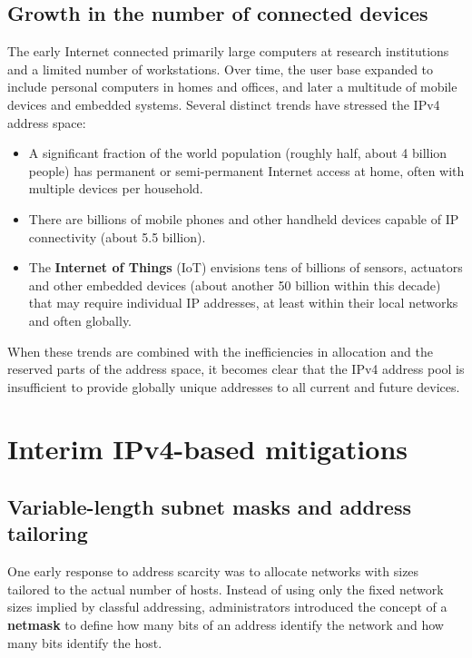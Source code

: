 \documentclass[11pt,a4paper,openany]{report}
\begin{document}
\subsection{Growth in the number of connected devices}

The early Internet connected primarily large computers at research institutions and a limited number of workstations. Over time, the user base expanded to include personal computers in homes and offices, and later a multitude of mobile devices and embedded systems. Several distinct trends have stressed the IPv4 address space:

\begin{itemize}
\item A significant fraction of the world population (roughly half, about 4
billion people) has permanent or semi-permanent Internet access at home,
often with multiple devices per household.
\item There are billions of mobile phones and other handheld devices capable of
IP connectivity (about 5.5 billion).
\item The \textbf{Internet of Things} (IoT) envisions tens of billions of
sensors, actuators and other embedded devices (about another 50 billion
within this decade) that may require individual IP addresses, at least
within their local networks and often globally.
\end{itemize}

When these trends are combined with the inefficiencies in allocation and the reserved parts of the address space, it becomes clear that the IPv4 address pool is insufficient to provide globally unique addresses to all current and future devices.

\section{Interim IPv4-based mitigations}

\subsection{Variable-length subnet masks and address tailoring}

One early response to address scarcity was to allocate networks with sizes tailored to the actual number of hosts. Instead of using only the fixed network sizes implied by classful addressing, administrators introduced the concept of a \textbf{netmask} to define how many bits of an address identify the network and how many bits identify the host.
\end{document}
